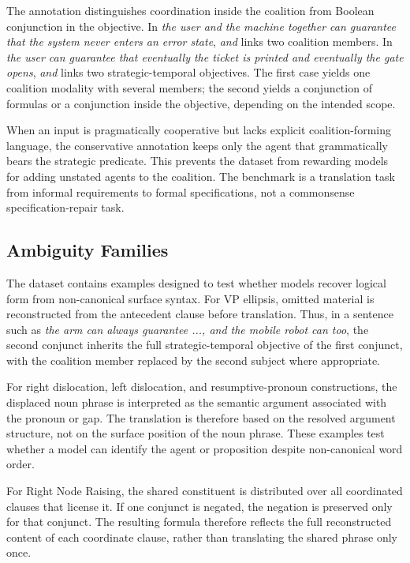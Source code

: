 \documentclass[letterpaper]{article}
\begin{document}
The annotation distinguishes coordination inside the coalition from Boolean conjunction in the objective. In \emph{the user and the machine together can guarantee that the system never enters an error state}, \emph{and} links two coalition members. In \emph{the user can guarantee that eventually the ticket is printed and eventually the gate opens}, \emph{and} links two strategic-temporal objectives. The first case yields one coalition modality with several members; the second yields a conjunction of formulas or a conjunction inside the objective, depending on the intended scope.

When an input is pragmatically cooperative but lacks explicit coalition-forming language, the conservative annotation keeps only the agent that grammatically bears the strategic predicate. This prevents the dataset from rewarding models for adding unstated agents to the coalition. The benchmark is a translation task from informal requirements to formal specifications, not a commonsense specification-repair task.

\subsection{Ambiguity Families}

The dataset contains examples designed to test whether models recover logical form from non-canonical surface syntax. For VP ellipsis, omitted material is reconstructed from the antecedent clause before translation. Thus, in a sentence such as \emph{the arm can always guarantee ..., and the mobile robot can too}, the second conjunct inherits the full strategic-temporal objective of the first conjunct, with the coalition member replaced by the second subject where appropriate.

For right dislocation, left dislocation, and resumptive-pronoun constructions, the displaced noun phrase is interpreted as the semantic argument associated with the pronoun or gap. The translation is therefore based on the resolved argument structure, not on the surface position of the noun phrase. These examples test whether a model can identify the agent or proposition despite non-canonical word order.

For Right Node Raising, the shared constituent is distributed over all coordinated clauses that license it. If one conjunct is negated, the negation is preserved only for that conjunct. The resulting formula therefore reflects the full reconstructed content of each coordinate clause, rather than translating the shared phrase only once.
\end{document}
